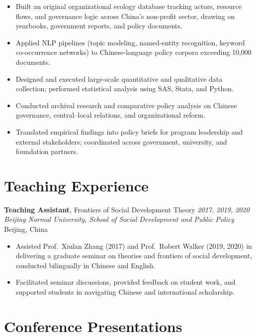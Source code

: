 \documentclass[11pt, letterpaper]{article}
\begin{document}
\begin{itemize}
  \item Built an original organizational ecology database tracking actors,
        resource flows, and governance logic across China's non-profit sector,
        drawing on yearbooks, government reports, and policy documents.
  \item Applied NLP pipelines (topic modeling, named-entity recognition,
        keyword co-occurrence networks) to Chinese-language policy corpora
        exceeding 10,000 documents.
  \item Designed and executed large-scale quantitative and qualitative data
        collection; performed statistical analysis using SAS, Stata, and Python.
  \item Conducted archival research and comparative policy analysis on Chinese
        governance, central--local relations, and organizational reform.
  \item Translated empirical findings into policy briefs for program leadership
        and external stakeholders; coordinated across government, university,
        and foundation partners.
\end{itemize}

\section{Teaching Experience}

\noindent\textbf{Teaching Assistant}, Frontiers of Social Development Theory
\hfill \textit{2017, 2019, 2020}\\
\textit{Beijing Normal University, School of Social Development and Public Policy}
\hfill Beijing, China
\begin{itemize}
  \item Assisted Prof.\ Xiulan Zhang (2017) and Prof.\ Robert Walker (2019, 2020)
        in delivering a graduate seminar on theories and frontiers of social
        development, conducted bilingually in Chinese and English.
  \item Facilitated seminar discussions, provided feedback on student work,
        and supported students in navigating Chinese and international scholarship.
\end{itemize}

\section{Conference Presentations}
\end{document}
